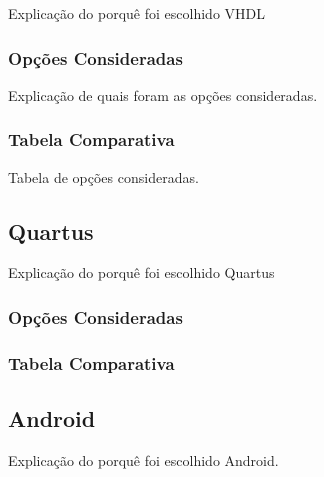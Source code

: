 	Explicação do porquê foi escolhido VHDL
	
	\subsubsection{Opções Consideradas}\label{vhdl-opcoes}
	
	Explicação de quais foram as opções consideradas.
	
	\subsubsection{Tabela Comparativa}\label{vhdl-comparativo}
	
	Tabela de opções consideradas.
	
	
	\subsection{Quartus}
	
	Explicação do porquê foi escolhido Quartus
	
	\subsubsection{Opções Consideradas}\label{quartus-opcoes}
	
	\lipsum[10]
	
	\subsubsection{Tabela Comparativa}\label{quartus-comparativo}
	
	\lipsum[11]
	
	\subsection{Android}
	
	Explicação do porquê foi escolhido Android.
